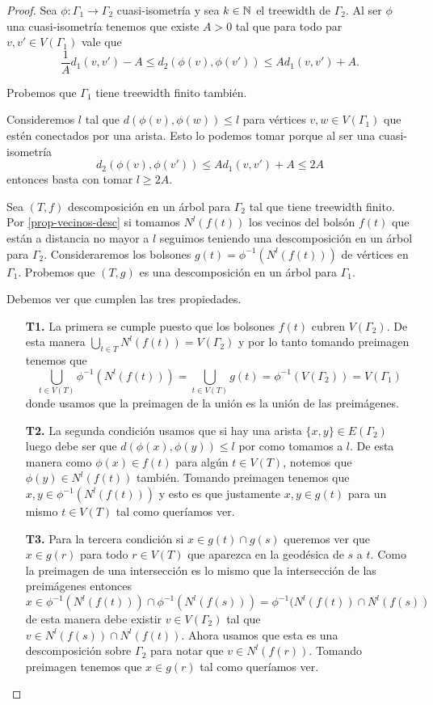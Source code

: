 \documentclass[tesis.tex]{subfiles}
\begin{document}
\begin{proof}
	Sea $\phi:\Gamma_1 \to \Gamma_2$ cuasi-isometría y sea $k \in \mathbb{N}$ el treewidth de $\Gamma_2$.
	Al ser $\phi$ una cuasi-isometría tenemos que existe $A > 0$ tal que para todo par $v,v' \in V(\Gamma_{1})$ vale que
	\[
	\frac{1}{A} d_{1}(v,v') - A \le d_{2}(\phi(v),\phi(v')) \le A d_{1}(v,v') + A.
	\]
	
	Probemos que $\Gamma_1$ tiene treewidth finito también.
	
	Consideremos $l$ tal que $d(\phi(v),\phi(w)) \le l$ para vértices $v,w \in V(\Gamma_1)$ que estén conectados por una arista.
	Esto lo podemos tomar porque al ser una cuasi-isometría 
	\[
	d_{2}(\phi(v),\phi(v')) \le A d_{1}(v,v') + A  \le 2A
	\]
	entonces basta con tomar $l \ge 2A$.
	
	Sea $(T,f)$ descomposición en un árbol para $\Gamma_{2}$ tal que tiene treewidth finito.
	Por \ref{prop-vecinos-desc} si tomamos $N^l(f(t))$ los vecinos del bolsón $f(t)$ que están a distancia no mayor a $l$ seguimos teniendo una descomposición en un árbol para $\Gamma_{2}$.  
	Consideraremos los bolsones $g(t) = \phi^{-1}(N^l(f(t)))$ de vértices en $\Gamma_1$. 
	Probemos que $(T,g)$ es una descomposición en un árbol para $\Gamma_{1}$.
	
	Debemos ver que cumplen las tres propiedades.
	
	\begin{enumerate}
		\item[\textbf{T1.}] La primera se cumple puesto que los bolsones $f(t)$ cubren $V(\Gamma_2)$. 
		De esta manera $\bigcup_{t \in T} N^l(f(t)) = V(\Gamma_2)$ y por lo tanto tomando preimagen tenemos que
		\[
		\bigcup_{t \in V(T)} \phi^{-1} (N^l (f(t))) = \bigcup_{t \in V(T)} g(t) = \phi^{-1} (V(\Gamma_2)) = V(\Gamma_1)
		\] 
		donde usamos que la preimagen de la unión es la unión de las preimágenes.
		\item[\textbf{T2.}] La segunda condición usamos que si hay una arista $\{x,y\} \in E(\Gamma_2)$ luego debe ser que $d(\phi(x),\phi(y)) \le l$ por como tomamos a $l$.
		De esta manera como $\phi(x) \in f(t)$ para algún $t \in V(T)$, notemos que $\phi(y) \in N^l(f(t))$ también. 
		Tomando preimagen tenemos que $x,y \in \phi^{-1}(N^l(f(t)))$ y esto es que justamente $x,y \in g(t)$ para un mismo $t \in V(T)$ tal como queríamos ver.		
		\item[\textbf{T3.}] Para la tercera condición si $x \in g(t) \cap g(s)$ queremos ver que $x \in g(r)$ para todo $r \in V(T)$ que aparezca en la geodésica de $s$ a $t$.
		Como la preimagen de una intersección es lo mismo que la intersección de las preimágenes entonces 
		\[
		x \in \phi^{-1}(N^l(f(t))) \cap \phi^{-1}(N^l(f(s))) = \phi^{-1}(N^l(f(t)) \cap N^l (f(s))
		\]
		de esta manera debe existir $v \in V(\Gamma_2)$ tal que $v \in N^l(f(s)) \cap N^l(f(t))$.
		Ahora usamos que esta es una descomposición sobre $\Gamma_2$ para notar que $v \in N^l(f(r))$.
		Tomando preimagen tenemos que $x \in g(r)$ tal como queríamos ver.
	\end{enumerate}
	

\end{proof}
\end{document}
